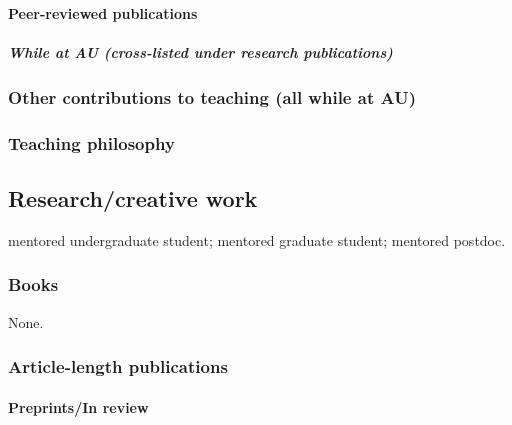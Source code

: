 \paragraph{Peer-reviewed publications}

\subparagraph*{While at AU (cross-listed under research publications)}
\nocite{*}
\printbibliography[filter=cvteachingpapersnopreprints, check=afteraustart, heading=none]

\subsubsection{Other contributions to teaching (all while at AU)}



\subsubsection{Teaching philosophy}


\subsection{Research/creative work}
\ugsymbol{}mentored undergraduate student;
\phdsymbol{}mentored graduate student;
\postdocsymbol{}mentored postdoc.

\subsubsection{Books}
None.

\subsubsection{Article-length publications}



\paragraph{Preprints/In review}
\nocite{*}
\printbibliography[filter=cvsubmitted, heading=none]

